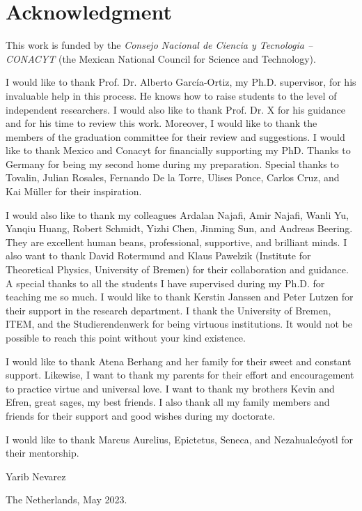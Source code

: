 \chapter*{Acknowledgment}
\thispagestyle{empty}
This work is funded by the \textit{Consejo Nacional de Ciencia y Tecnologia -- CONACYT} (the Mexican National Council for Science and Technology).

I would like to thank Prof. Dr. Alberto Garc\'ia-Ortiz, my Ph.D. supervisor, for his invaluable help in this process. He knows how to raise students to the level of independent researchers. I would also like to thank Prof. Dr. X for his guidance and for his time to review this work. Moreover, I would like to thank the members of the graduation committee for their review and suggestions. I would like to thank Mexico and Conacyt for financially supporting my PhD. Thanks to Germany for being my second home during my preparation. Special thanks to Tovalin, Julian Rosales, Fernando De la Torre, Ulises Ponce, Carlos Cruz, and Kai M\"uller for their inspiration.

I would also like to thank my colleagues Ardalan Najafi, Amir Najafi, Wanli Yu, Yanqiu Huang, Robert Schmidt, Yizhi Chen, Jinming Sun, and Andreas Beering. They are excellent human beans, professional, supportive, and brilliant minds. I also want to thank David Rotermund and Klaus Pawelzik (Institute for Theoretical Physics, University of Bremen) for their collaboration and guidance. A special thanks to all the students I have supervised during my Ph.D. for teaching me so much. I would like to thank Kerstin Janssen and Peter Lutzen for their support in the research department. I thank the University of Bremen, ITEM, and the Studierendenwerk for being virtuous institutions. It would not be possible to reach this point without your kind existence.


I would like to thank Atena Berhang and her family for their sweet and constant support. Likewise, I want to thank my parents for their effort and encouragement to practice virtue and universal love. I want to thank my brothers Kevin and Efren, great sages, my best friends. I also thank all my family members and friends for their support and good wishes during my doctorate.

I would like to thank Marcus Aurelius, Epictetus, Seneca, and Nezahualc\'oyotl for their mentorship.


Yarib Nevarez

The Netherlands, May 2023.




